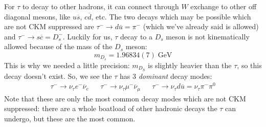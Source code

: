 \documentclass[11pt, oneside]{article}   	%
\theoremstyle{definition}
\numberwithin{equation}{subsection}		%
\begin{document}
For $\tau$ to decay to other hadrons, it can connect through $W$ exchange to other off diagonal mesons, like $u \overline s$, $c\overline d$, etc. The two decays which 
may be possible which are not CKM suppressed are $\tau^-\rightarrow d \overline u = \pi^-$ (which we've already said is allowed) and $\tau^-\rightarrow s\overline c = 
D_s^-$. Luckily for us, $\tau$ decay to a $D_s$ meson is not kinematically allowed because of the mass of the $D_s$ meson:
\begin{equation}
	m_{D_s} = 1.96834(7) \;\mathrm{GeV}
\end{equation}
This is why we needed a little precision: $m_{D_S}$ is slightly heavier than the $\tau$, so this decay doesn't exist. So, we see the $\tau$ has 3 
\textit{dominant} decay modes:
\begin{align}
	\tau^-\rightarrow \nu_\tau e^-\overline\nu_e && \tau^-\rightarrow \nu_\tau \mu^-\overline\nu_\mu && \tau^-\rightarrow \nu_\tau d \overline u = \nu_\tau \pi^- \pi^0
\end{align}
Note that these are only the most common decay modes which are not CKM suppressed: there are a whole boatload of other hadronic decays the $\tau$ can undergo, 
but these are the most common. 
\end{document}
